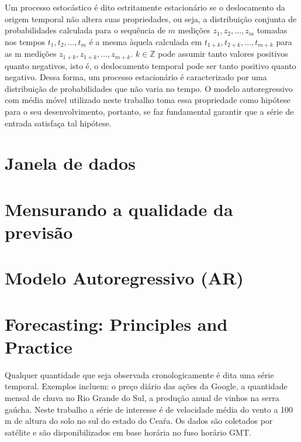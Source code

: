 \documentclass[
	12pt,				%
	openright,			%
	oneside,			%
	a4paper,			%
	english,			%
	french,				%
	spanish,			%
	brazil				%
	]{abntex2}
\begin{document}
Um processo estocástico é dito estritamente estacionário se o deslocamento da origem temporal não altera suas propriedades, ou seja, a distribuição conjunta de probabilidades calculada para o sequência de $m$ medições $z_1,z_2,\dots,z_m$ tomadas nos tempos $t_1, t_2, \dots, t_m$ é a mesma àquela calculada em $t_{1+k}, t_{2+k}, \dots, t_{m+k}$ para as m medições $z_{1+k},z_{1+k},\dots,z_{m+k}$. $k\in\mathbb{Z}$ pode assumir tanto valores positivos quanto negativos, isto é, o deslocamento temporal pode ser tanto positivo quanto negativo. Dessa forma, 
um processo estacionário é caracterizado por uma distribuição de probabilidades que não varia no tempo. O modelo autoregressivo com média móvel utilizado neste trabalho toma essa propriedade como hipótese para o seu desenvolvimento, portanto, se faz fundamental garantir que a série de entrada satisfaça tal hipótese.

\chapter{Janela de dados}


\chapter{Mensurando a qualidade da previsão}

\chapter{Modelo Autoregressivo (AR)}

\chapter{Forecasting: Principles and Practice}


Qualquer quantidade que seja observada cronologicamente é dita uma série temporal. Exemplos incluem: o preço diário das ações da Google, a quantidade mensal de chuva no Rio Grande do Sul, a produção anual de vinhos na serra gaúcha. Neste trabalho a série de interesse é de velocidade média do vento a 100 m de altura do solo no sul do estado do Ceaŕa. Os dados são coletados por satélite e são disponibilizados em base horária no fuso horário GMT. 
\end{document}
